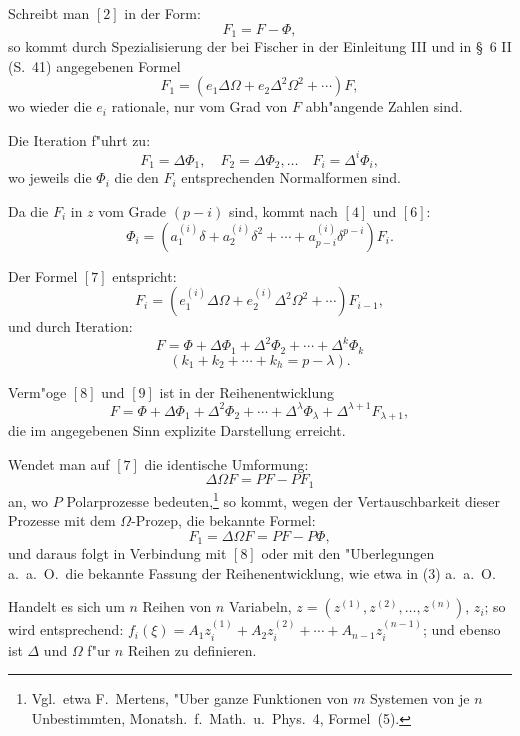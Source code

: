 \documentclass[12pt,a4paper]{article}
\begin{document}
Schreibt man $[2]$ in der Form:
\begin{equation}
F_1 = F - \Phi,
\end{equation}
so kommt durch Spezialisierung der bei Fischer in der Einleitung III und in \S\ 6 II (S.~41) angegebenen Formel
\begin{equation}
F_1 = (e_1\Delta\Omega + e_2\Delta^2\Omega^2 + \cdots) F,
\end{equation}
wo wieder die $e_i$ rationale, nur vom Grad von $F$ abh"angende Zahlen sind.

Die Iteration f"uhrt zu:
\[
F_1 = \Delta \Phi_1, \quad F_2 = \Delta \Phi_2, \ldots \quad F_i = \Delta^i \Phi_i,
\]
wo jeweils die $\Phi_i$ die den $F_i$ entsprechenden Normalformen sind.

Da die $F_i$ in $z$ vom Grade $(p-i)$ sind, kommt nach $[4]$ und $[6]$:
\begin{equation}
\Phi_i = (a_1^{(i)}\delta + a_2^{(i)}\delta^2 + \cdots + a_{p-i}^{(i)}\delta^{p-i}) F_i.
\end{equation}

Der Formel $[7]$ entspricht:
\begin{equation}
F_i = (e_1^{(i)}\Delta\Omega + e_2^{(i)}\Delta^2\Omega^2 + \cdots) F_{i-1},
\end{equation}
und durch Iteration:
\begin{equation}
F = \Phi + \Delta \Phi_1 + \Delta^2 \Phi_2 + \cdots + \Delta^k \Phi_k
\end{equation}
\[
(k_1 + k_2 + \cdots + k_h = p - \lambda).
\]

Verm"oge $[8]$ und $[9]$ ist in der Reihenentwicklung
\begin{equation}
F = \Phi + \Delta \Phi_1 + \Delta^2 \Phi_2 + \cdots + \Delta^\lambda \Phi_\lambda + \Delta^{\lambda+1} F_{\lambda+1},
\end{equation}
die im angegebenen Sinn explizite Darstellung erreicht.

Wendet man auf $[7]$ die identische Umformung:
\[
\Delta\Omega F = PF - PF_1
\]
an, wo $P$ Polarprozesse bedeuten,\footnote{Vgl.\ etwa F.\ Mertens, "Uber ganze Funktionen von $m$ Systemen von je $n$ Unbestimmten, Monatsh.\ f.\ Math.\ u.\ Phys.\ 4, Formel~(5).} so kommt, wegen der Vertauschbarkeit dieser Prozesse mit dem $\Omega$-Prozep, die bekannte Formel:
\[
F_1 = \Delta \Omega F = PF - P\Phi,
\]
und daraus folgt in Verbindung mit $[8]$ oder mit den "Uberlegungen a.\ a.\ O.\ die bekannte Fassung der Reihenentwicklung, wie etwa in (3) a.\ a.\ O.

Handelt es sich um $n$ Reihen von $n$ Variabeln, $z = (z^{(1)}, z^{(2)}, \ldots, z^{(n)})$, $z_i$; so wird entsprechend: $f_i(\xi) = A_1 z_i^{(1)} + A_2 z_i^{(2)} + \cdots + A_{n-1} z_i^{(n-1)}$; und ebenso ist $\Delta$ und $\Omega$ f"ur $n$ Reihen zu definieren.
\end{document}
